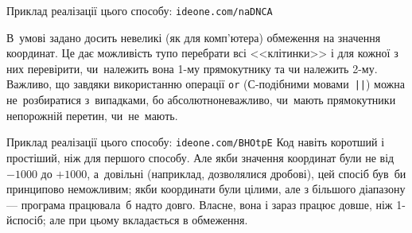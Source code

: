 Приклад реалізації цього способу: \verb"ideone.com/naDNCA"


В~умові задано досить невеликі (як для комп’ютера) обмеження на значення координат. Це дає можливість тупо перебрати всі <<клітинки>> і для кожної з них перевірити, чи~належить вона \mbox{1-му} прямокутнику та чи належить \mbox{2-му}. Важливо, що завдяки використанню операції \texttt{or} (\mbox{С-подіб}\-ними мовами~\verb"||") можна не~розбиратися з~випадками, бо абсолютно\nolinebreak[2] не\nolinebreak[3] важливо, чи~мають прямокутники непорожній перетин, чи~не~мають.

Приклад реалізації цього способу: \verb"ideone.com/BHOtpE"\hspace{1em plus 2em}
Код навіть коротший і простіший, ніж для першого способу. Але якби значення координат були не від $-1000$ до $+1000$, а~довільні (наприклад, дозволялися дробові), цей спосіб був~би принципово неможливим; якби координати були цілими, але з більшого діапазону\nolinebreak[3] --- програма працювала~б надто довго. Власне, вона і зараз працює довше, ніж \mbox{1-й}\nolinebreak[3] спосіб; але при цьому вкладається в обмеження. %
